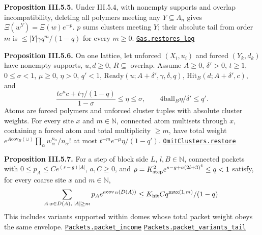 \documentclass[
  letterpaper,
  11pt]{article}
\newcounter{none} %
\begin{document}
\textbf{Proposition III.5.5.} Under III.5.4, with nonempty supports and
overlap incompatibility, deleting all polymers meeting any
\(Y\subseteq\Lambda_n\) gives \(\Xi(w^Y)=\Xi(w)e^{-p}\). \(p\) sums
clusters meeting \(Y\); their absolute tail from order \(m\) is
\(\le|Y|\gamma q^m/(1-q)\) for every \(m\ge0\).
\href{https://github.com/yang-mills-group/OpenAI-YM-20261028/blob/3456e5e75cf8d4cd558955a5c7638fba2d68f464/YM/Push/ABSOLUTE_SUMS/Absence.lean\#L69-L95}{\texttt{Gas.restores\_log}}

\textbf{Proposition III.5.6.} On one lattice, let unforced \((X_i,u_i)\)
and forced \((Y_k,d_k)\) have nonempty supports, \(u,d\ge0\),
\(R\subseteq\) overlap. Assume \(A\ge0\), \(\delta'>0\), \(t\ge1\),
\(0\le\sigma<1\), \(\mu\ge0\), \(\eta>0\), \(q'<1\),
\(\mathrm{Ready}(u;A+\delta',\gamma,\delta,q)\),
\(\mathrm{Hit}_B(d;A+\delta',c)\), and
\[\frac{te^\mu c+t\gamma/(1-q)}{1-\sigma}\le\eta\le\sigma,\qquad4\mathrm{ball}_B\eta/\delta'\le q'.\]
Atoms are forced polymers and unforced cluster tuples with absolute
cluster weights. For every site \(x\) and \(m\in\mathbb N\), connected
atom multisets through \(x\), containing a forced atom and total
multiplicity \(\ge m\), have total weight
\(e^{A\mathrm{cov}_B(\cup)}\prod_\alpha w_\alpha^{n_\alpha}/n_\alpha!\)
at most \(t^{-m}e^{-\mu}\eta/(1-q')\).
\href{https://github.com/yang-mills-group/OpenAI-YM-20261028/blob/3456e5e75cf8d4cd558955a5c7638fba2d68f464/YM/Push/ABSOLUTE_SUMS/Omissions.lean\#L48-L100}{\texttt{OmitClusters.restore}}

\textbf{Proposition III.5.7.} For a step of block side \(L\),
\(l,B\in\mathbb N\), connected packets with
\(0\le p_A\le Ce^{(s-g)|A|}\), \(a,C\ge0\), and
\(\rho=K_{\rm step}^2e^{s-g+a(2l+3)^4}\le q<1\) satisfy, for every
coarse site \(x\) and \(m\in\mathbb N\),
\[\sum_{A:x\in D(A),\,|A|\ge m}p_Ae^{a\mathrm{cov}_B(D(A))}\le K_{\rm hit}Cq^{\max(1,m)}/(1-q).\]
This includes variants supported within domes whose total packet weight
obeys the same envelope.
\href{https://github.com/yang-mills-group/OpenAI-YM-20261028/blob/3456e5e75cf8d4cd558955a5c7638fba2d68f464/YM/Push/ABSOLUTE_SUMS/Charge.lean\#L66-L105}{\texttt{Packets.packet\_income}}
\href{https://github.com/yang-mills-group/OpenAI-YM-20261028/blob/3456e5e75cf8d4cd558955a5c7638fba2d68f464/YM/Push/ABSOLUTE_SUMS/Charge.lean\#L124-L175}{\texttt{Packets.packet\_variants\_tail}}
\end{document}
